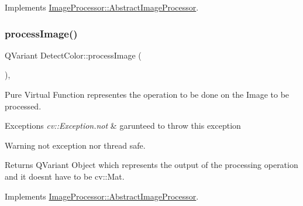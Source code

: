 Implements \hyperlink{class_image_processor_1_1_abstract_image_processor_ad033ae911918b0f6842b7b1d6cdd2b90}{Image\+Processor\+::\+Abstract\+Image\+Processor}.

\mbox{\label{class_image_processor_1_1_detect_color_afb14622f8e1390f1cf887cc8bf1da568}} 
\subsubsection{\texorpdfstring{process\+Image()}{processImage()}\hspace{0.1cm}{\footnotesize\ttfamily [2/2]}}
{\footnotesize\ttfamily Q\+Variant Detect\+Color\+::process\+Image (\begin{DoxyParamCaption}{ }\end{DoxyParamCaption})\hspace{0.3cm}{\ttfamily [override]}, {\ttfamily [virtual]}}



Pure Virtual Function representes the operation to be done on the Image to be processed. 


\begin{DoxyExceptions}{Exceptions}
{\em cv\+::\+Exception.\+not} & garunteed to throw this exception \\
\hline
\end{DoxyExceptions}
\begin{DoxyWarning}{Warning}
not exception nor thread safe. 
\end{DoxyWarning}
\begin{DoxyReturn}{Returns}
Q\+Variant Object which represents the output of the processing operation and it doesn\textquotesingle{}t have to be cv\+::\+Mat. 
\end{DoxyReturn}


Implements \hyperlink{class_image_processor_1_1_abstract_image_processor_ad033ae911918b0f6842b7b1d6cdd2b90}{Image\+Processor\+::\+Abstract\+Image\+Processor}.

\mbox{\label{class_image_processor_1_1_detect_color_a71bfe53fe223a7342e17e64adf483b84}} 
